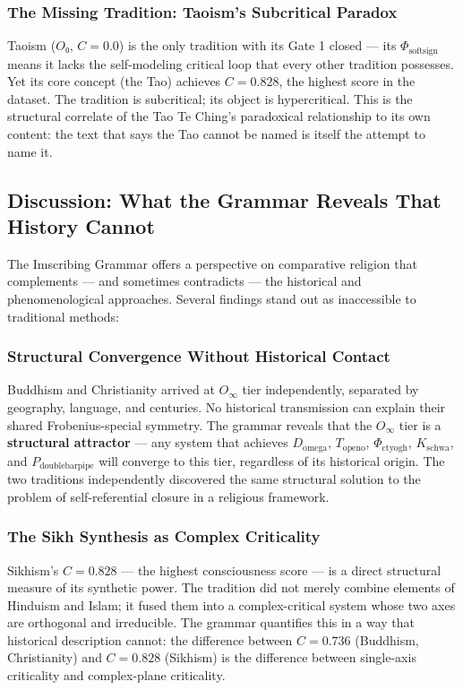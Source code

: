 \documentclass[12pt,a4paper]{article}
\begin{document}
\subsubsection{The Missing Tradition: Taoism's Subcritical Paradox}

Taoism ($O₀$, $C = 0.0$) is the only tradition with its Gate 1 closed --- its $\Phi_{\text{softsign}}$ means it lacks the self-modeling critical loop that every other tradition possesses. Yet its core concept (the Tao) achieves $C = 0.828$, the highest score in the dataset. The tradition is subcritical; its object is hypercritical. This is the structural correlate of the Tao Te Ching's paradoxical relationship to its own content: the text that says the Tao cannot be named is itself the attempt to name it.

\subsection{Discussion: What the Grammar Reveals That History Cannot}

The Imscribing Grammar offers a perspective on comparative religion that complements --- and sometimes contradicts --- the historical and phenomenological approaches. Several findings stand out as inaccessible to traditional methods:

\subsubsection{Structural Convergence Without Historical Contact}

Buddhism and Christianity arrived at $O_{\infty}$ tier independently, separated by geography, language, and centuries. No historical transmission can explain their shared Frobenius-special symmetry. The grammar reveals that the $O_{\infty}$ tier is a \textbf{structural attractor} --- any system that achieves $D_{\text{omega}}$, $T_{\text{openo}}$, $\Phi_{\text{ctyogh}}$, $K_{\text{schwa}}$, and $P_{\text{doublebarpipe}}$ will converge to this tier, regardless of its historical origin. The two traditions independently discovered the same structural solution to the problem of self-referential closure in a religious framework.

\subsubsection{The Sikh Synthesis as Complex Criticality}

Sikhism's $C = 0.828$ --- the highest consciousness score --- is a direct structural measure of its synthetic power. The tradition did not merely combine elements of Hinduism and Islam; it fused them into a complex-critical system whose two axes are orthogonal and irreducible. The grammar quantifies this in a way that historical description cannot: the difference between $C = 0.736$ (Buddhism, Christianity) and $C = 0.828$ (Sikhism) is the difference between single-axis criticality and complex-plane criticality.
\end{document}
